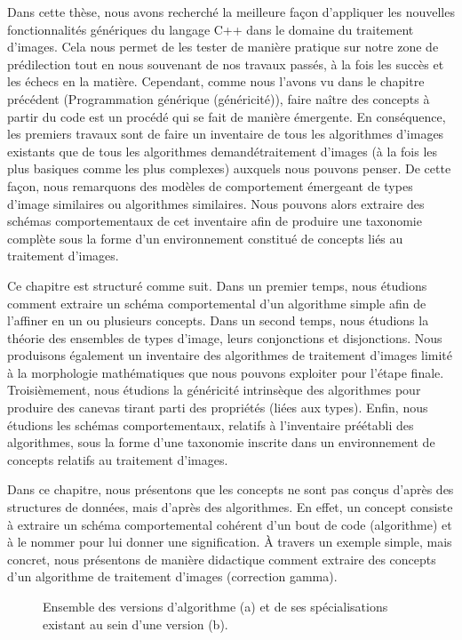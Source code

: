 Dans cette thèse, nous avons recherché la meilleure façon d'appliquer les nouvelles fonctionnalités génériques du
langage C++ dans le domaine du traitement d'images. Cela nous permet de les tester de manière pratique sur notre zone de
prédilection tout en nous souvenant de nos travaux passés, à la fois les succès et les échecs en la matière. Cependant,
comme nous l'avons vu dans le chapitre précédent (Programmation générique (généricité)), faire naître des concepts à
partir du code est un procédé qui se fait de manière émergente. En conséquence, les premiers travaux sont de faire un
inventaire de tous les algorithmes d'images existants que de tous les algorithmes demandétraitement d'images (à la
fois les plus basiques comme les plus complexes) auxquels nous pouvons penser. De cette façon, nous remarquons des
modèles de comportement émergeant de types d'image similaires ou algorithmes similaires. Nous pouvons alors extraire des
schémas comportementaux de cet inventaire afin de produire une taxonomie complète sous la forme d'un environnement
constitué de concepts liés au traitement d'images.

Ce chapitre est structuré comme suit. Dans un premier temps, nous étudions comment extraire un schéma comportemental
d'un algorithme simple afin de l'affiner en un ou plusieurs concepts. Dans un second temps, nous étudions la théorie des
ensembles de types d'image, leurs conjonctions et disjonctions. Nous produisons également un inventaire des algorithmes
de traitement d'images limité à la morphologie mathématiques que nous pouvons exploiter pour l'étape finale.
Troisièmement, nous étudions la généricité intrinsèque des algorithmes pour produire des canevas tirant parti des
propriétés (liées aux types). Enfin, nous étudions les schémas comportementaux, relatifs à l'inventaire préétabli des
algorithmes, sous la forme d'une taxonomie inscrite dans un environnement de concepts relatifs au traitement d'images.

Dans ce chapitre, nous présentons que les concepts ne sont pas conçus d'après des structures de données, mais d'après
des algorithmes. En effet, un concept consiste à extraire un schéma comportemental cohérent d'un bout de code
(algorithme) et à le nommer pour lui donner une signification. \`{A} travers un exemple simple, mais concret, nous
présentons de manière didactique comment extraire des concepts d'un algorithme de traitement d'images (correction
gamma).

\begin{figure}[htbp]
  \centering
  \hfil
  \caption[]{Ensemble des versions d'algorithme (a) et de ses spécialisations existant au sein d'une version (b).}
  \label{resume:fig:image.version.vs.specialization}
\end{figure}

